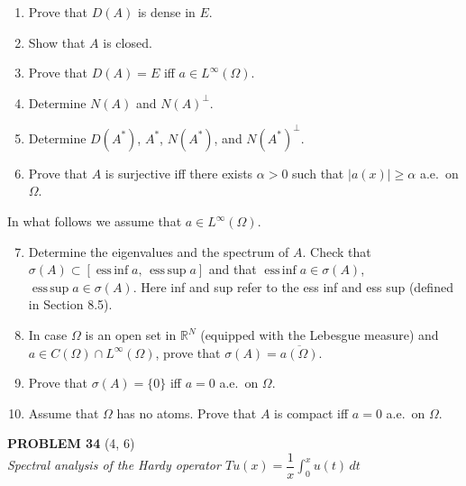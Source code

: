 \documentclass[12pt]{article}
\newcommand{\abs}[1]{\left|#1\right|}
\newcommand{\R}{\mathbb{R}}
\begin{document}
\begin{enumerate}
\item Prove that $D(A)$ is dense in $E$.
 
\noindent[\textit{Hint:} Given $u \in E$, consider the sequence $u_n(x) = (1 + n^{-1}\abs{a(x)})^{-1}u(x)$.]
 
\item Show that $A$ is closed.
 
\item Prove that $D(A) = E$ iff $a \in L^\infty(\Omega)$.
 
 
\item Determine $N(A)$ and $N(A)^\perp$.
 
\item Determine $D(A^*)$, $A^*$, $N(A^*)$, and $N(A^*)^\perp$.
 
\item Prove that $A$ is surjective iff there exists $\alpha > 0$ such that $\abs{a(x)} \ge \alpha$
a.e.\ on $\Omega$.
 
\end{enumerate}
 
\noindent In what follows we assume that $a \in L^\infty(\Omega)$.
 
\begin{enumerate}
\setcounter{enumi}{6}
\item Determine the eigenvalues and the spectrum of $A$. Check that
$\sigma(A) \subset [\operatorname{ess\,inf} a,\, \operatorname{ess\,sup} a]$ and that $\operatorname{ess\,inf} a \in \sigma(A)$,
$\operatorname{ess\,sup} a \in \sigma(A)$. Here inf and sup refer to the ess inf and ess sup
(defined in Section 8.5).
 
\item In case $\Omega$ is an open set in $\R^N$ (equipped with the Lebesgue measure) and
$a \in C(\Omega) \cap L^\infty(\Omega)$, prove that $\sigma(A) = \overline{a(\Omega)}$.
 
\item Prove that $\sigma(A) = \{0\}$ iff $a = 0$ a.e.\ on $\Omega$.
 
\item Assume that $\Omega$ has no atoms. Prove that $A$ is compact iff $a = 0$ a.e.\ on $\Omega$.
\end{enumerate}
 
\bigskip
 
\noindent\textbf{PROBLEM 34} (4, 6)\\[4pt]
\textit{Spectral analysis of the Hardy operator $Tu(x) = \dfrac{1}{x}\int_0^x u(t)\,dt$}
 
\end{document}
